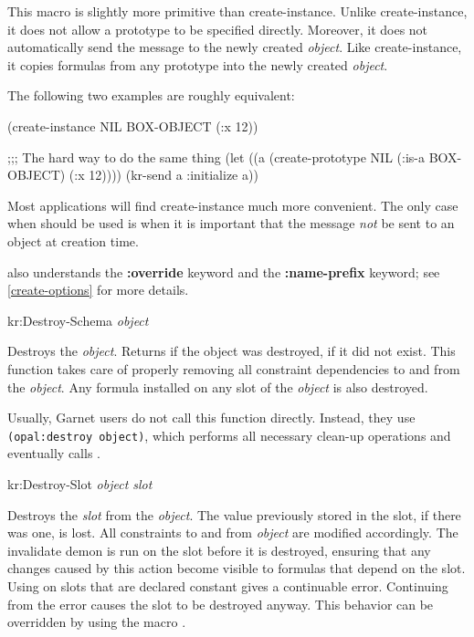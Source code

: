 This macro is slightly more primitive than create-instance.  Unlike
create-instance, it does not allow a prototype to be specified
directly.  Moreover, it does not automatically send the 
message to the newly created {\it object}.  Like create-instance, it
copies formulas from any prototype into the newly created {\it object}.

The following two examples are roughly equivalent:
\begin{programexample}
(create-instance NIL BOX-OBJECT (:x 12))

;;; The hard way to do the same thing
(let ((a (create-prototype NIL
	   (:is-a BOX-OBJECT) (:x 12))))
  (kr-send a :initialize a))
\end{programexample}

Most applications will find create-instance much more convenient.  The
only case when  should be used is when it is important
that the  message {\it not} be sent to an object at creation
time.

 also understands the  {\bf :override} keyword and the
{\bf :name-prefix} keyword; see \ref{create-options} for more details.



\value{f-top}
\begin{example}
kr:Destroy-Schema {\it object}\value{Function}
\end{example}

Destroys the {\it object}.  Returns \value{T} if the object was destroyed,
\value{nil} if it did not exist.  This function takes care of properly
removing all constraint dependencies to and from the {\it object}.  Any
formula installed on any slot of the {\it object} is also destroyed.

Usually, Garnet users do not call this function directly.  Instead, they
use {\tt (opal:destroy object)}, which performs all necessary clean-up
operations and eventually calls .



\value{f-top}
\begin{example}
kr:Destroy-Slot {\it object slot}\value{Function}
\end{example}

Destroys the {\it slot} from the {\it object}.  The value previously stored in
the slot, if there was one, is lost.  All constraints to and from {\it object}
are modified accordingly.  The invalidate demon is run on the slot before
it is destroyed, ensuring that any changes caused by this action become
visible to formulas that depend on the slot.  Using  on slots
that are declared constant gives a continuable error.  Continuing from the
error causes the slot to be destroyed anyway.  This behavior can be overridden
by using the macro .






